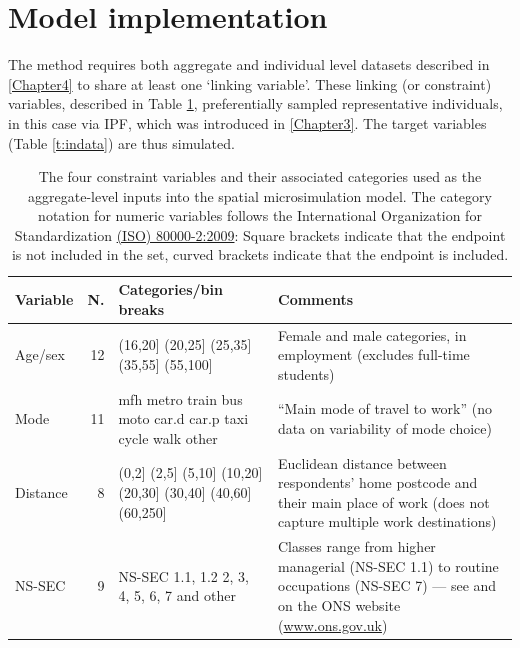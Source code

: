 \section{Model implementation} \label{Methods}
The method requires both aggregate and individual
level datasets described in \cref{Chapter4} to
share at least one `linking variable'. These linking (or constraint)
variables, described in Table \ref{t:constraints},
preferentially sampled representative
individuals, in this case via IPF, which was introduced in
\cref{Chapter3}. The target variables (Table
\ref{t:indata}) are thus simulated.

\begin{table}[htbp]
\caption[Aggregate-level inputs into the spatial microsimulation model]
{The four constraint variables and their associated categories used as
the aggregate-level inputs into the spatial microsimulation model.
The category notation for numeric variables follows
the International Organization for Standardization
\href{http://www.iso.org/iso/catalogue_detail?csnumber=31887}
{(ISO) 80000-2:2009}:
Square brackets indicate that the endpoint is not included in the set,
curved brackets indicate that the endpoint is included.}

\begin{center}
\begin{tabular}{lrp{3cm}p{8cm}}\toprule
Variable & \multicolumn{1}{l}{N. } & Categories/bin breaks & Comments \\ \midrule
Age/sex & 12 & (16,20] (20,25] (25,35] (35,55] (55,100] & Female and male categories, in employment (excludes full-time students) \\
Mode & 11 & mfh       metro     train     bus       moto      car.d     car.p
taxi      cycle     walk      other & “Main mode of travel to work” (no data on variability of mode choice) \\
Distance & 8 & (0,2] (2,5] (5,10] (10,20] (20,30] (30,40] (40,60] (60,250] &
Euclidean distance between respondents' home postcode and their main place of work (does not capture multiple work destinations) \\
NS-SEC & 9 & NS-SEC 1.1, 1.2 2, 3, 4, 5, 6, 7 and other & Classes range
from higher managerial (NS-SEC  1.1) to routine occupations (NS-SEC 7) --- see
\citep{chandola2000new} and on the ONS website
(\href{http://www.ons.gov.uk/ons/guide-method/classifications/current-standard-classifications/soc2010/soc2010-volume-3-ns-sec--rebased-on-soc2010--user-manual/index.html}{www.ons.gov.uk}) \\
\bottomrule
\end{tabular}\end{center}
\label{t:constraints}
\end{table}


